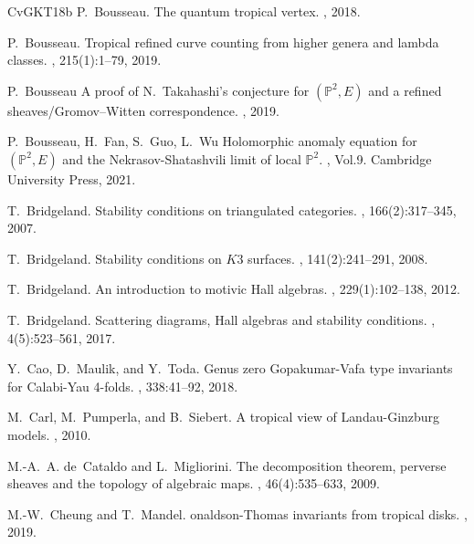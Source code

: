 \documentclass[12pt, a4paper]{amsart}
\newcommand\PP{\mathbb P}
\begin{document}
\begin{thebibliography}{CvGKT18b}
P.~Bousseau.
\newblock The quantum tropical vertex.
, 2018.

P.~Bousseau.
\newblock Tropical refined curve counting from higher genera and lambda
  classes.
, 215(1):1--79, 2019.

P.~Bousseau
\newblock A proof of {N}.\ {T}akahashi's conjecture for {$(\PP^2,E)$} and a refined sheaves/{G}romov--{W}itten correspondence.
, 2019.
 
 
P.~Bousseau, H.~Fan, S.~Guo, L.~Wu 
\newblock Holomorphic anomaly equation for $(\PP^2,E)$ and the Nekrasov-Shatashvili limit of local $\PP^2$.
, Vol.9. Cambridge University Press, 2021.


T.~Bridgeland.
\newblock Stability conditions on triangulated categories.
, 166(2):317--345, 2007.

T.~Bridgeland.
\newblock Stability conditions on {$K3$} surfaces.
, 141(2):241--291, 2008.

T.~Bridgeland.
\newblock An introduction to motivic {H}all algebras.
, 229(1):102--138, 2012.

T.~Bridgeland.
\newblock Scattering diagrams, {H}all algebras and stability conditions.
, 4(5):523--561, 2017.

Y.~Cao, D.~Maulik, and Y.~Toda.
\newblock Genus zero {G}opakumar-{V}afa type invariants for {C}alabi-{Y}au
  4-folds.
, 338:41--92, 2018.


M.~Carl, M.~Pumperla, and B.~Siebert.
\newblock A tropical view of {L}andau-{G}inzburg models.
, 2010.
  
M.-A.~A. de~Cataldo and L.~Migliorini.
\newblock The decomposition theorem, perverse sheaves and the topology of
  algebraic maps.
, 46(4):535--633, 2009.
  

M.-W.~Cheung and T.~Mandel.
onaldson-{T}homas invariants from tropical disks.
, 2019.



\end{thebibliography}
\end{document}
